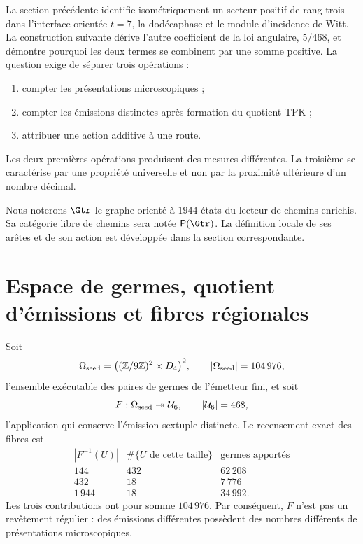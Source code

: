 \label{p3-20260826:chap:medida-accion-positiva}

La section précédente identifie isométriquement un secteur positif de rang trois dans
l’interface orientée \(t=7\), la dodécaphase et le module d’incidence de Witt. La construction
suivante dérive l’autre coefficient de la loi angulaire, \(5/468\), et
démontre pourquoi les deux termes se combinent par une somme positive. La
question exige de séparer
trois opérations :
\begin{enumerate}
  \item compter les présentations microscopiques ;
  \item compter les émissions distinctes après formation du quotient TPK ;
  \item attribuer une action additive à une route.
\end{enumerate}
Les deux premières opérations produisent des mesures différentes. La troisième se
caractérise par une propriété universelle et non par la proximité ultérieure
d’un nombre décimal.

Nous noterons \(\Gtr\) le graphe orienté à \(1944\) états du lecteur de
chemins enrichis. Sa catégorie libre de chemins sera notée
\(\mathsf P(\Gtr)\). La définition locale de ses arêtes et de son action est
développée dans la section correspondante.

\section{Espace de germes, quotient d’émissions et fibres régionales}

Soit
\[
 \Omega_{\rm seed}
 =\bigl((\mathbb Z/9\mathbb Z)^2\times D_4\bigr)^2,
 \qquad
 |\Omega_{\rm seed}|=104\,976,
\]
l’ensemble exécutable des paires de germes de l’émetteur fini, et soit
\[
 F:\Omega_{\rm seed}\twoheadrightarrow\mathcal U_6,
 \qquad
 |\mathcal U_6|=468,
\]
l’application qui conserve l’émission sextuple distincte. Le recensement exact des
fibres est
\[
\begin{array}{c|c|c}
|F^{-1}(U)|&\#\{U\text{ de cette taille}\}&\text{germes apportés}\\
\hline
144&432&62\,208\\
432&18&7\,776\\
1\,944&18&34\,992.
\end{array}
\]
Les trois contributions ont pour somme \(104\,976\). Par conséquent, \(F\) n’est pas un
revêtement régulier : des émissions différentes possèdent des nombres différents de
présentations microscopiques.

